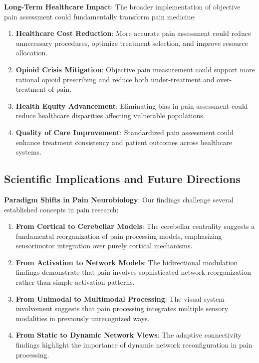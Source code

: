 \documentclass[10pt,journal,compsoc]{IEEEtran}
\begin{document}
\textbf{Long-Term Healthcare Impact}:
The broader implementation of objective pain assessment could fundamentally transform pain medicine:

\begin{enumerate}
\item \textbf{Healthcare Cost Reduction}: More accurate pain assessment could reduce unnecessary procedures, optimize treatment selection, and improve resource allocation.

\item \textbf{Opioid Crisis Mitigation}: Objective pain measurement could support more rational opioid prescribing and reduce both under-treatment and over-treatment of pain.

\item \textbf{Health Equity Advancement}: Eliminating bias in pain assessment could reduce healthcare disparities affecting vulnerable populations.

\item \textbf{Quality of Care Improvement}: Standardized pain assessment could enhance treatment consistency and patient outcomes across healthcare systems.
\end{enumerate}

\subsection{Scientific Implications and Future Directions}

\textbf{Paradigm Shifts in Pain Neurobiology}:
Our findings challenge several established concepts in pain research:

\begin{enumerate}
\item \textbf{From Cortical to Cerebellar Models}: The cerebellar centrality suggests a fundamental reorganization of pain processing models, emphasizing sensorimotor integration over purely cortical mechanisms.

\item \textbf{From Activation to Network Models}: The bidirectional modulation findings demonstrate that pain involves sophisticated network reorganization rather than simple activation patterns.

\item \textbf{From Unimodal to Multimodal Processing}: The visual system involvement suggests that pain processing integrates multiple sensory modalities in previously unrecognized ways.

\item \textbf{From Static to Dynamic Network Views}: The adaptive connectivity findings highlight the importance of dynamic network reconfiguration in pain processing.
\end{enumerate}
\end{document}

